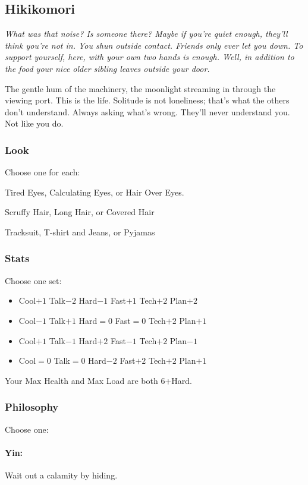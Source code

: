 \subsection{Hikikomori}
{\itshape What was that noise? Is someone there? Maybe if you're quiet
  enough, they'll think you're not in. You shun outside
  contact. Friends only ever let you down. To support yourself, here,
  with your own two hands is enough. Well, in addition to the food
  your nice older sibling leaves outside your door.

The gentle hum of the machinery, the moonlight streaming in through
the viewing port. This is the life. Solitude is not loneliness; that's
what the others don't understand. Always asking what's wrong. They'll
never understand you. Not like you do.}

\subsubsection{Look}
Choose one for each:

Tired Eyes, Calculating Eyes, or Hair Over Eyes.

Scruffy Hair, Long Hair, or Covered Hair

Tracksuit, T-shirt and Jeans, or Pyjamas

\subsubsection{Stats}
Choose one set:
\begin{itemize}
\setlength\itemsep{0em}
\item Cool$+1$ Talk$-2$ Hard$-1$ Fast$+1$ Tech$+2$ Plan$+2$
\item Cool$-1$ Talk$+1$ Hard${=}0$ Fast${=}0$ Tech$+2$ Plan$+1$
\item Cool$+1$ Talk$-1$ Hard$+2$ Fast$-1$ Tech$+2$ Plan$-1$
\item Cool${=}0$ Talk${=}0$ Hard$-2$ Fast$+2$ Tech$+2$ Plan$+1$
\end{itemize}

Your Max Health and Max Load are both 6+Hard.

\subsubsection{Philosophy}
Choose one:
\paragraph{Yin:} Wait out a calamity by hiding.
